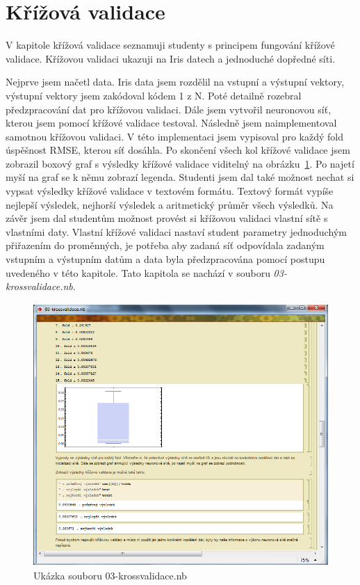 \documentclass[11pt,twoside,a4paper]{book}
\begin{document}
\section{Křížová validace}
V kapitole křížová validace seznamuji studenty s principem fungování křížové validace. Křížovou validaci ukazuji na Iris datech a jednoduché dopředné síti.

Nejprve jsem načetl data. Iris data jsem rozdělil na vstupní a výstupní vektory, výstupní vektory jsem zakódoval kódem 1 z N. Poté detailně rozebral předzpracování dat pro křížovou validaci. Dále jsem vytvořil neuronovou síť, kterou jsem pomocí křížové validace testoval. Následně jsem naimplementoval samotnou křížovou validaci. V této implementaci jsem vypisoval pro každý fold úspěšnost RMSE, kterou síť dosáhla. Po skončení všech kol křížové validace jsem zobrazil boxový graf s výsledky křížové validace viditelný na obrázku~\ref{fig:krossvalidace}. Po najetí myší na graf se k němu zobrazí legenda. Studenti jsem dal také možnost nechat si vypsat výsledky křížové validace v textovém formátu. Textový formát vypíše nejlepší výsledek, nejhorší výsledek a aritmetický průměr všech výsledků. Na závěr jsem dal studentům možnost provést si křížovou validaci vlastní sítě s vlastními daty. Vlastní křížové validaci nastaví student parametry jednoduchým přiřazením do proměnných, je potřeba aby  zadaná síť odpovídala zadaným vstupním a výstupním datům a data byla předzpracována pomocí postupu uvedeného v této kapitole. Tato kapitola se nachází v souboru \textit{03-krossvalidace.nb}.

\begin{figure}[h!]
\begin{center}
\includegraphics[height=10cm]{figures/ukazka03.png}
\caption{Ukázka souboru 03-krossvalidace.nb}
\label{fig:krossvalidace}
\end{center}
\end{figure}
\end{document}
